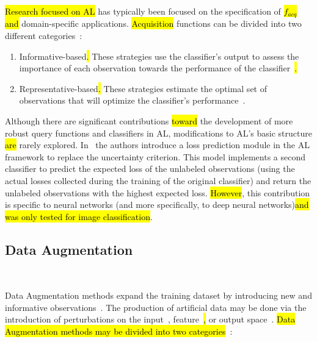\documentclass[preprint, 12pt]{elsarticle}
\begin{document}
\hl{Research focused on AL} has typically been focused on the
specification of \hl{$f_{acq}$ and} domain-specific
applications. \hl{Acquisition} functions can be divided into two different
categories~\cite{Gu2021, Kumar2020}: 

\begin{enumerate}

    \item Informative-based\hl{. }These strategies use the
        classifier's output to assess the importance of each observation
        towards the performance of the classifier~\cite{Fu2013}\hl{.}

    \item Representative-based\hl{. }These strategies estimate 
        the optimal set of observations that will optimize the classifier's
        performance~\cite{Kumar2020}.

\end{enumerate}

Although there are significant contributions \hl{toward} the development of
more robust query functions and classifiers in AL, modifications to AL's basic
structure \hl{are} rarely explored. In~\cite{Yoo2019} the authors introduce a
loss prediction module in the AL framework to replace the uncertainty
criterion.  This model implements a second classifier to predict the expected
loss of the unlabeled observations (using the actual losses collected during
the training of the original classifier) and return the unlabeled observations
with the highest expected loss. \hl{However}, this contribution is specific to
neural networks (and more specifically, to deep neural networks)\hl{and was
    only tested for image classification}.

\subsection{Data Augmentation}~\label{sec:data_augmentation}

Data Augmentation methods expand the training dataset by introducing new and
informative observations~\cite{Behpour2019}. The production of artificial data
may be done via the introduction of perturbations on the
input~\cite{fonseca2021improving}, feature~\cite{DeVries2017}\hl{,} or output
space~\cite{Behpour2019}. \hl{Data Augmentation methods may be divided into
two categories}~\cite{Shorten2019}:
\end{document}
